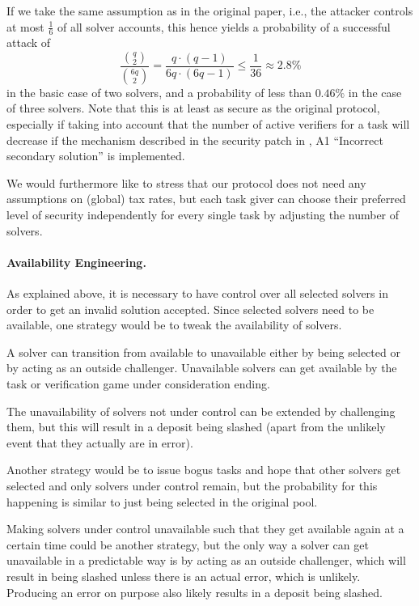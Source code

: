 \documentclass[a4paper]{article}
\begin{document}
If we take the same assumption as in the original paper, i.e., the attacker controls at most $\frac16$ of all solver accounts, this hence yields a probability of a successful attack of
\[\frac{\binom{q}{2}}{\binom{6q}{2}} = \frac{q\cdot(q-1)}{6q\cdot(6q-1)}\leq \frac{1}{36}\approx 2.8\%\]
in the basic case of two solvers, and a probability of less than $0.46\%$ in the case of three solvers. Note that this is at least as secure as the original protocol, especially if taking into account that the number of active verifiers for a task will decrease if the mechanism described in the security patch in \cite{truebit}, A1 ``Incorrect  secondary  solution'' is implemented.

We would furthermore like to stress that our protocol does not need any assumptions on (global) tax rates, but each task giver can choose their preferred level of security independently for every single task by adjusting the number of solvers. 


\paragraph{Availability Engineering.}
As explained above, it is necessary to have control over all selected solvers
in order to get an invalid solution accepted. Since selected solvers need
to be available, one strategy would be to tweak the availability of solvers.

A solver can transition from available to unavailable either by being selected
or by acting as an outside challenger. Unavailable solvers can get available
by the task or verification game under consideration ending.

The unavailability of solvers not under control can be extended
by challenging them, but this will result in a deposit being slashed
(apart from the unlikely event that they actually are in error).

Another strategy would be to issue bogus tasks and hope that other solvers
get selected and only solvers under control remain, but the probability for
this happening is similar to just being selected in the original pool.

Making solvers under control unavailable such that they get available again
at a certain time could be another strategy, but the only way a solver can
get unavailable in a predictable way is by acting
as an outside challenger, which will result in being slashed unless there
is an actual error, which is unlikely. Producing an error on purpose also
likely results in a deposit being slashed.
\end{document}
